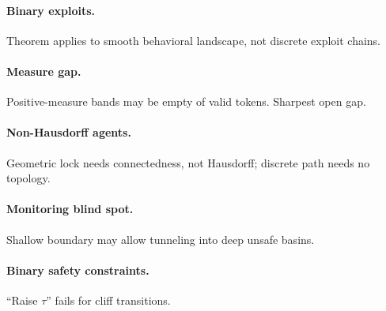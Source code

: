 \documentclass[11pt]{article}
\begin{document}
\paragraph{Binary exploits.} Theorem applies to smooth behavioral landscape, not discrete exploit chains.

\paragraph{Measure gap.} Positive-measure bands may be empty of valid tokens. Sharpest open gap.

\paragraph{Non-Hausdorff agents.} Geometric lock needs connectedness, not Hausdorff; discrete path needs no topology.

\paragraph{Monitoring blind spot.} Shallow boundary may allow tunneling into deep unsafe basins.

\paragraph{Binary safety constraints.} ``Raise $\tau$'' fails for cliff transitions.
\end{document}
